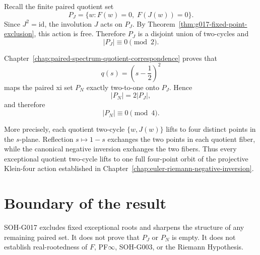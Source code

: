 Recall the finite paired quotient set
\[
 P_J=\{w:F(w)=0,\;F(J(w))=0\}.
\]
Since $J^2=\mathrm{id}$, the involution $J$ acts on $P_J$.  By Theorem~\ref{thm:g017-fixed-point-exclusion}, this action is free.  Therefore $P_J$ is a disjoint union of two-cycles and
\begin{equation}
 \boxed{|P_J|\equiv0\pmod2}.
 \label{eq:g017-pj-even}
\end{equation}

Chapter~\ref{chap:paired-spectrum-quotient-correspondence} proves that
\[
 q(s)=\left(s-\frac12\right)^2
\]
maps the paired xi set $P_N$ exactly two-to-one onto $P_J$.  Hence
\[
 |P_N|=2|P_J|,
\]
and therefore
\begin{equation}
 \boxed{|P_N|\equiv0\pmod4}.
 \label{eq:g017-pn-four}
\end{equation}

More precisely, each quotient two-cycle $\{w,J(w)\}$ lifts to four distinct points in the $s$-plane.  Reflection $s\mapsto1-s$ exchanges the two points in each quotient fiber, while the canonical negative inversion exchanges the two fibers.  Thus every exceptional quotient two-cycle lifts to one full four-point orbit of the projective Klein-four action established in Chapter~\ref{chap:euler-riemann-negative-inversion}.

\section{Boundary of the result}

SOH-G017 excludes fixed exceptional roots and sharpens the structure of any remaining paired set.  It does not prove that $P_J$ or $P_N$ is empty.  It does not establish real-rootedness of $F$, PF$\infty$, SOH-G003, or the Riemann Hypothesis.
